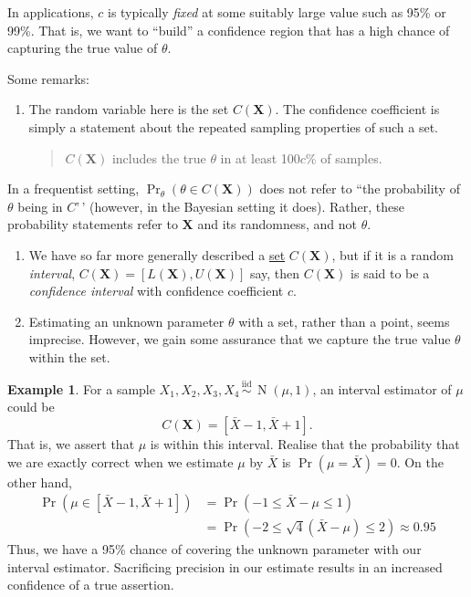 \documentclass[
]{book}
\newcommand{\bX}{{\boldsymbol X}}
\DeclareMathOperator{\N}{N}
\newcommand{\iid}{\,\overset{\text{iid}}{\sim}\,}
\theoremstyle{definition}
\theoremstyle{definition}
\newtheorem{example}{Example}[chapter]
\theoremstyle{definition}
\theoremstyle{definition}
\theoremstyle{remark}
\begin{document}
In applications, \(c\) is typically \emph{fixed} at some suitably large value such as 95\% or 99\%.
That is, we want to ``build'' a confidence region that has a high chance of capturing the true value of \(\theta\).

Some remarks:

\begin{enumerate}
\def\labelenumi{\arabic{enumi}.}
\item
  The random variable here is the set \(C(\bX)\). The confidence coefficient is simply a statement about the repeated sampling properties of such a set.

  \begin{quote}
  \(C(\bX)\) includes the true \(\theta\) in at least 100\(c\)\% of samples.
  \end{quote}
\end{enumerate}

In a frequentist setting, \(\Pr_\theta \left( \theta \in C(\bX) \right)\) does not refer to ``the probability of \(\theta\) being in \(C\)'\,' (however, in the Bayesian setting it does).
Rather, these probability statements refer to \(\bX\) and its randomness, and not \(\theta\).

\begin{enumerate}
\def\labelenumi{\arabic{enumi}.}
\setcounter{enumi}{1}
\item
  We have so far more generally described a \underline{set} \(C(\bX)\), but if it is a random \emph{interval}, \(C(\bX)=[L(\bX), U(\bX)]\) say, then \(C(\bX)\) is said to be a \emph{confidence interval} with confidence coefficient \(c\).
\item
  Estimating an unknown parameter \(\theta\) with a set, rather than a point, seems imprecise. However, we gain some assurance that we capture the true value \(\theta\) within the set.
\end{enumerate}

\begin{example}
For a sample \(X_1,X_2,X_3,X_4\iid\N(\mu,1)\), an interval estimator of \(\mu\) could be
\[
C(\bX) = [\bar X - 1, \bar X + 1].
\]
That is, we assert that \(\mu\) is within this interval.
Realise that the probability that we are exactly correct when we estimate \(\mu\) by \(\bar X\) is \(\Pr(\mu=\bar X) = 0\).
On the other hand,
\begin{align*}
\Pr\left( \mu \in [\bar X - 1, \bar X + 1] \right)
&= \Pr(-1 \leq \bar X - \mu \leq 1) \\
&= \Pr\left( -2 \leq \sqrt{4}(\bar X - \mu) \leq 2 \right) \approx 0.95
\end{align*}
Thus, we have a 95\% chance of covering the unknown parameter with our interval estimator.
Sacrificing precision in our estimate results in an increased confidence of a true assertion.
\end{example}
\end{document}
